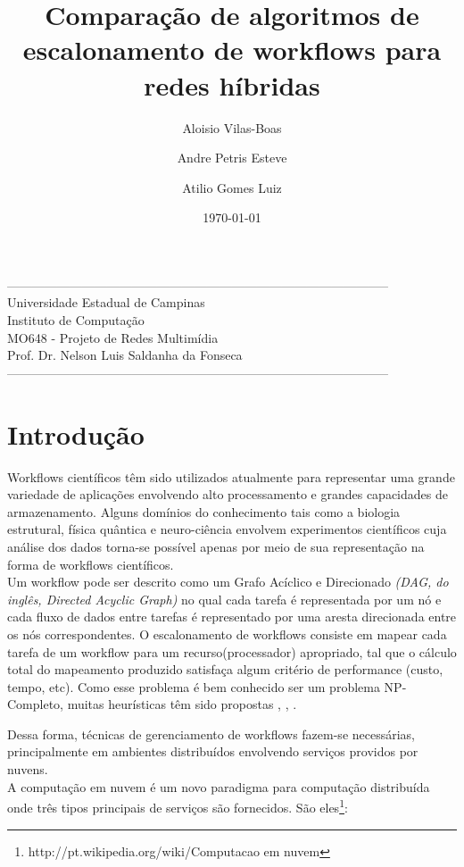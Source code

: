 \documentclass[a4paper,10pt]{article}
\title{Comparação de algoritmos de escalonamento de workflows para redes híbridas}
\author{Aloisio Vilas-Boas\and Andre Petris Esteve\and Atilio Gomes Luiz}
\date{\today}
\begin{document}
\maketitle

\begin{center}
--------------------------------------------------------------------------------------------\\
Universidade Estadual de Campinas\\
Instituto de Computação\\
MO648 - Projeto de Redes Multimídia\\
Prof. Dr. Nelson Luis Saldanha da Fonseca\\
--------------------------------------------------------------------------------------------\\
\end{center}

\section{Introdução}

Workflows científicos têm sido utilizados atualmente para representar uma grande variedade de aplicações envolvendo
alto processamento e grandes capacidades de armazenamento. Alguns domínios do conhecimento tais como a biologia estrutural,
física quântica e neuro-ciência envolvem experimentos científicos cuja análise dos dados torna-se possível apenas por meio de sua representação
na forma de workflows científicos\cite{pso_a}.\\

Um workflow pode ser descrito como um Grafo Acíclico e Direcionado \emph{(DAG, do inglês, Directed Acyclic Graph)} no qual cada tarefa 
é representada por um nó e cada fluxo de dados entre tarefas é representado por uma aresta direcionada entre os nós correspondentes. O escalonamento 
de workflows consiste em mapear cada tarefa de um workflow para um recurso(processador) apropriado, tal que o cálculo total do mapeamento produzido 
satisfaça algum critério de performance (custo, tempo, etc). Como esse problema é bem conhecido ser um problema NP-Completo, muitas heurísticas têm 
sido propostas \cite{bit}, \cite{pso_a}, \cite{pcp}.

Dessa forma, técnicas de gerenciamento de workflows fazem-se necessárias, principalmente em ambientes distribuídos 
envolvendo serviços providos por nuvens.\\

A computação em nuvem é um novo paradigma para computação distribuída onde três tipos principais de serviços são fornecidos. São eles\footnote{http://pt.wikipedia.org/wiki/Computacao em nuvem}:
\end{document}
